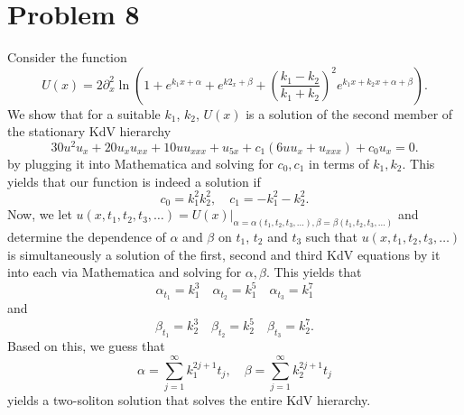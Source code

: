 \documentclass{article}
\begin{document}
\section{Problem 8}
Consider the function
$$
U(x)=2\partial_x^2\ln\left(1+e^{k_1
	x+\alpha}+e^{k2_x+\beta}+\left(\frac{k_1-k_2}{k_1+k_2}\right)^2
e^{k_1x+k_2 x+\alpha+\beta}\right).
$$
We show that for a suitable $k_1$, $k_2$,
$U(x)$ is a solution of the second member of the stationary KdV hierarchy
$$
30u^2u_x+20u_x u_{xx}+10u u_{xxx}+u_{5x}+c_1(6uu_x+u_{xxx})+c_0 u_x=0.
$$
by plugging it into Mathematica and solving for $c_0,c_1$ in terms of $k_1,k_2$. This yields that our function is indeed a solution if 
\[
c_0=k_1^2k_2^2,\quad c_1=-k_1^2-k_2^2.
\]
Now, we let
$u(x,t_1,t_2,t_3,\ldots)=U(x)|_{\alpha=\alpha(t_1,t_2,t_3,\ldots),
	\beta=\beta(t_1,t_2,t_3,\ldots)}$ and determine the dependence of $\alpha$ and $\beta$ on $t_1$, $t_2$ and $t_3$ such that
$u(x,t_1,t_2,t_3,\ldots)$ is simultaneously a solution of the first, second and
third KdV equations by it into each via Mathematica and solving for $\alpha,\beta$.
This yields that
\[
\alpha_{t_1}=k_1^3\quad\alpha_{t_2}=k_1^5\quad\alpha_{t_3}=k_1^7
\]
and 
\[
\beta_{t_1}=k_2^3\quad\beta_{t_2}=k_2^5\quad\beta_{t_3}=k_2^7.
\]
Based on this, we guess that
\[
\alpha=\sum_{j=1}^{\infty}k_1^{2j+1}t_j,\quad\beta=\sum_{j=1}^{\infty}k_2^{2j+1}t_j
\]
yields a two-soliton solution that
solves the entire KdV hierarchy.
\end{document}
